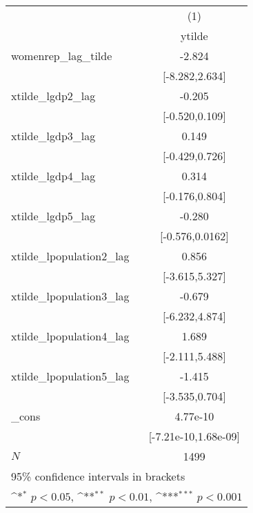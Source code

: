 {
\def\sym#1{\ifmmode^{#1}\else\(^{#1}\)\fi}
\begin{tabular}{l*{1}{c}}
\hline\hline
            &\multicolumn{1}{c}{(1)}        \\
            &\multicolumn{1}{c}{ytilde}     \\
\hline
womenrep\_lag\_tilde&                -2.824         \\
            &        [-8.282,2.634]         \\
[1em]
xtilde\_lgdp2\_lag&                -0.205         \\
            &        [-0.520,0.109]         \\
[1em]
xtilde\_lgdp3\_lag&                 0.149         \\
            &        [-0.429,0.726]         \\
[1em]
xtilde\_lgdp4\_lag&                 0.314         \\
            &        [-0.176,0.804]         \\
[1em]
xtilde\_lgdp5\_lag&                -0.280         \\
            &       [-0.576,0.0162]         \\
[1em]
xtilde\_lpopulation2\_lag&                 0.856         \\
            &        [-3.615,5.327]         \\
[1em]
xtilde\_lpopulation3\_lag&                -0.679         \\
            &        [-6.232,4.874]         \\
[1em]
xtilde\_lpopulation4\_lag&                 1.689         \\
            &        [-2.111,5.488]         \\
[1em]
xtilde\_lpopulation5\_lag&                -1.415         \\
            &        [-3.535,0.704]         \\
[1em]
\_cons      &              4.77e-10         \\
            &  [-7.21e-10,1.68e-09]         \\
\hline
\(N\)       &                  1499         \\
\hline\hline
\multicolumn{2}{l}{\footnotesize 95\% confidence intervals in brackets}\\
\multicolumn{2}{l}{\footnotesize \sym{*} \(p<0.05\), \sym{**} \(p<0.01\), \sym{***} \(p<0.001\)}\\
\end{tabular}
}
